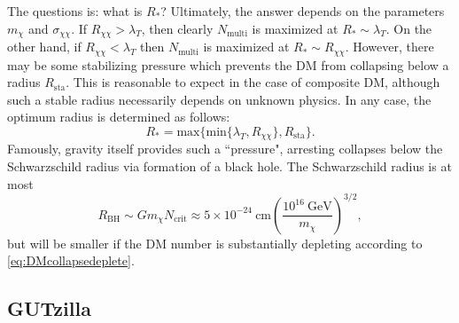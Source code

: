 \documentclass[preprintnumbers,amsmath,amssymb,prd,superscriptaddress]{revtex4}
\newcommand{\GeV}{\text{GeV}}
\newcommand{\cm}{\text{cm}}
\def\r{\right)}
\def\l{\left(}
\begin{document}
The questions is: what is $R_*$?
Ultimately, the answer depends on the parameters $m_\chi$ and $\sigma_{\chi \chi}$. 
If $R_{\chi \chi} > \lambda_T$, then clearly $N_\text{multi}$ is maximized at $R_* \sim \lambda_T$.
On the other hand, if $R_{\chi \chi} < \lambda_T$ then $N_\text{multi}$ is maximized at $R_* \sim R_{\chi \chi}$.
However, there may be some stabilizing pressure which prevents the DM from collapsing below a radius $R_\text{sta}$.
This is reasonable to expect in the case of composite DM, although such a stable radius necessarily depends on unknown physics. 
In any case, the optimum radius is determined as follows:
\begin{equation}
R_* = \text{max}\{\text{min}\{\lambda_T, R_{\chi \chi}\}, R_\text{sta}\}.
\end{equation}
Famously, gravity itself provides such a ``pressure", arresting collapses below the Schwarzschild radius via formation of a black hole. 
The Schwarzschild radius is at most
\begin{equation}
R_\text{BH} \sim G m_\chi N_\text{crit} \approx 5 \times 10^{-24} ~\cm \l \frac{10^{16} ~\GeV}{m_\chi} \r^{3/2},
\end{equation}
but will be smaller if the DM number is substantially depleting according to \eqref{eq:DMcollapsedeplete}.

\subsection{GUTzilla}
\end{document}
